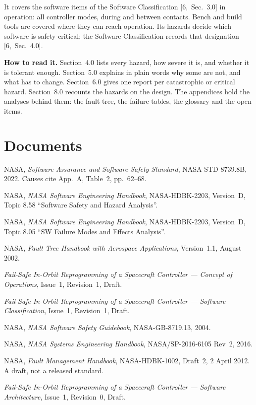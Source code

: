 \documentclass[11pt,a4paper]{article}
\begin{document}
It covers the software items of the Software Classification [6,~Sec.~3.0] in
operation: all controller modes, during and between contacts. Bench and build
tools are covered where they can reach operation. Its hazards decide which
software is safety-critical; the Software Classification records that
designation [6,~Sec.~4.0].

\noindent\textbf{How to read it.} Section~4.0 lists every hazard, how severe
it is, and whether it is tolerant enough. Section~5.0 explains in plain words
why some are not, and what has to change. Section~6.0 gives one report per
catastrophic or critical hazard. Section~8.0 recounts the hazards on the
design. The appendices hold the analyses behind them:
the fault tree, the failure tables, the glossary and the open items.

\section{Documents}
\noindent [1] NASA, \emph{Software Assurance and Software Safety Standard},
NASA-STD-8739.8B, 2022. Causes cite App.~A, Table~2, pp.~62--68.

\noindent [2] NASA, \emph{NASA Software Engineering Handbook}, NASA-HDBK-2203,
Version~D, Topic 8.58 ``Software Safety and Hazard Analysis''.

\noindent [3] NASA, \emph{NASA Software Engineering Handbook}, NASA-HDBK-2203,
Version~D, Topic 8.05 ``SW Failure Modes and Effects Analysis''.

\noindent [4] NASA, \emph{Fault Tree Handbook with Aerospace Applications},
Version~1.1, August 2002.

\noindent [5] \emph{Fail-Safe In-Orbit Reprogramming of a Spacecraft
Controller --- Concept of Operations}, Issue~1, Revision~1, Draft.

\noindent [6] \emph{Fail-Safe In-Orbit Reprogramming of a Spacecraft
Controller --- Software Classification}, Issue~1, Revision~1, Draft.

\noindent [7] NASA, \emph{NASA Software Safety Guidebook}, NASA-GB-8719.13,
2004.

\noindent [8] NASA, \emph{NASA Systems Engineering Handbook},
NASA/SP-2016-6105 Rev~2, 2016.

\noindent [9] NASA, \emph{Fault Management Handbook}, NASA-HDBK-1002, Draft~2,
2 April 2012. A draft, not a released standard.

\noindent [10] \emph{Fail-Safe In-Orbit Reprogramming of a Spacecraft
Controller --- Software Architecture}, Issue~1, Revision~0, Draft.
\end{document}
